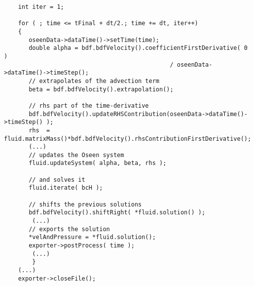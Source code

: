 \begin{verbatim}
    int iter = 1;

    for ( ; time <= tFinal + dt/2.; time += dt, iter++)
    {
       oseenData->dataTime()->setTime(time);
       double alpha = bdf.bdfVelocity().coefficientFirstDerivative( 0 ) 
                                               / oseenData->dataTime()->timeStep();
       // extrapolates of the advection term
       beta = bdf.bdfVelocity().extrapolation();
        
       // rhs part of the time-derivative
       bdf.bdfVelocity().updateRHSContribution(oseenData->dataTime()->timeStep() );       
       rhs  = fluid.matrixMass()*bdf.bdfVelocity().rhsContributionFirstDerivative(); 
       (...)
       // updates the Oseen system       
       fluid.updateSystem( alpha, beta, rhs );
    
       // and solves it
       fluid.iterate( bcH );
        
       // shifts the previous solutions
       bdf.bdfVelocity().shiftRight( *fluid.solution() );
        (...)
       // exports the solution
       *velAndPressure = *fluid.solution();
       exporter->postProcess( time );
        (...)
        }
    (...)
    exporter->closeFile();
        \end{verbatim}

